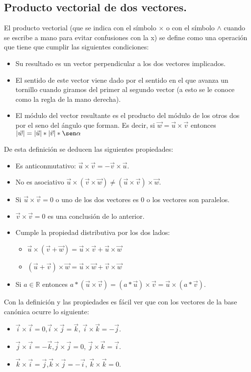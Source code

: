 \documentclass[a4paper,11pt,answers]{exam}
\begin{document}
\subsection{Producto vectorial de dos vectores.}
El producto vectorial (que se indica con el símbolo $\times$ o con el símbolo $\wedge$ cuando se escribe a mano para evitar confusiones con la x) se define como una operación que tiene que cumplir las siguientes condiciones:
\begin{itemize}
	\item Su resultado es un vector perpendicular a los dos vectores implicados.
	\item El sentido de este vector viene dado por el sentido en el que avanza un tornillo cuando giramos del primer al segundo vector (a esto se le conoce como la regla de la mano derecha).
	\item El módulo del vector resultante es el producto del módulo de los otros dos por el seno del ángulo que forman. Es decir, si $\vec w = \vec u \times \vec v$ entonces $|\vec w| = |\vec u|*|\vec{v}| *\sen \alpha$
\end{itemize}
De esta definición se deducen las siguientes propiedades:
\begin{itemize}
	\item Es anticonmutativo: $\vec{u} \times \vec{v} = -\vec{v}\times\vec{u}$.
	\item No es asociativo $\vec u \times (\vec v \times \vec{w}) \neq
	(\vec{u}\times \vec v)\times \vec w$.
	\item Si $\vec u\times \vec v = 0$ o uno de los dos vectores es 0 o los vectores son paralelos.
	\item $\vec v \times \vec v =0$ es una conclusión de lo anterior.
	\item Cumple la propiedad distributiva por los dos lados:
	\begin{itemize}
		\item $\vec u \times (\vec v + \vec w) = \vec u \times \vec v +
		\vec u \times \vec w$
		\item $(\vec u + \vec v) \times \vec w = \vec u \times \vec w + \vec v \times \vec w$
	\end{itemize}
	\item Si $a \in \mathbb{R}$ entonces $a*(\vec u \times \vec v)=(a*\vec u) \times \vec v = \vec u \times (a*\vec v)$.
\end{itemize}

Con la definición y las propiedades es fácil ver que con los vectores de la base canónica ocurre lo siguiente:
\begin{itemize}
	\item $\vec i \times \vec i = 0$,\quad $\vec i \times \vec j = \vec k$,
	\quad $\vec i \times \vec k = -\vec j$.
	\item $\vec j \times \vec i = -\vec k$,\quad $\vec j \times \vec j = 0$,
	\quad $\vec j \times \vec k = \vec i$.
	\item $\vec k \times \vec i = \vec j$,\quad $\vec k \times \vec j = -\vec i$,
	\quad $\vec k \times \vec k = 0$.
\end{itemize}
\end{document}

